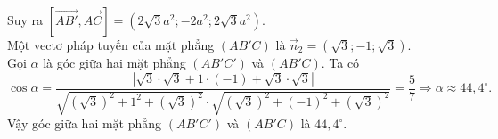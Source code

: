 \begin{ex}
{{
		}
		\noindent
		Suy ra $\left[\overrightarrow{AB'}, \overrightarrow{AC}\right]=\left(2\sqrt{3}a^2;-2a^2;2\sqrt{3}a^2\right)$.\\
		Một vectơ pháp tuyến của mặt phẳng $\left(AB'C\right)$ là $\overrightarrow{n}_2 = \left(\sqrt{3};-1;\sqrt{3}\right)$.\\
		Gọi $\alpha$ là góc giữa hai mặt phẳng $\left(AB'C'\right)$ và $\left(AB'C\right)$. Ta có
		\[\cos \alpha =\dfrac{\left|\sqrt{3}\cdot\sqrt{3}+1\cdot (-1)+\sqrt{3}\cdot \sqrt{3}\right|}{\sqrt{\left(\sqrt{3}\right)^2+1^2+\left(\sqrt{3}\right)^2}\cdot \sqrt{\left(\sqrt{3}\right)^2+(-1)^2+\left(\sqrt{3}\right)^2}}=\dfrac{5}{7}\Rightarrow \alpha
		\approx 44{,}4^\circ.\]
		Vậy góc giữa hai mặt phẳng $\left(AB'C'\right)$ và $\left(AB'C\right)$ là $44{,}4^\circ$.
	}
\end{ex}

